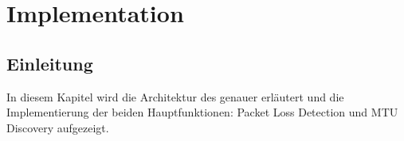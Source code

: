 \chapter{Implementation}
\label{chap:Implementation}

\section{Einleitung}
In diesem Kapitel wird die Architektur des \tool{} genauer erläutert und die Implementierung der beiden Hauptfunktionen: Packet Loss Detection und \acs{MTU} Discovery aufgezeigt.


\clearpage


\clearpage

 
\clearpage

 